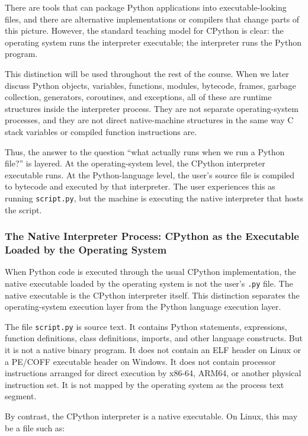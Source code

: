 \documentclass[a4paper,twoside]{report}
\begin{document}
There are tools that can package Python applications into executable-looking files, and there are alternative implementations or compilers that change parts of this picture. However, the standard teaching model for CPython is clear: the operating system runs the interpreter executable; the interpreter runs the Python program.

This distinction will be used throughout the rest of the course. When we later discuss Python objects, variables, functions, modules, bytecode, frames, garbage collection, generators, coroutines, and exceptions, all of these are runtime structures inside the interpreter process. They are not separate operating-system processes, and they are not direct native-machine structures in the same way C stack variables or compiled function instructions are.

Thus, the answer to the question ``what actually runs when we run a Python file?'' is layered. At the operating-system level, the CPython interpreter executable runs. At the Python-language level, the user's source file is compiled to bytecode and executed by that interpreter. The user experiences this as running \texttt{script.py}, but the machine is executing the native interpreter that hosts the script.


\subsubsection{The Native Interpreter Process: CPython as the Executable Loaded by the Operating System}

When Python code is executed through the usual CPython implementation, the native executable loaded by the operating system is not the user's \texttt{.py} file. The native executable is the CPython interpreter itself. This distinction separates the operating-system execution layer from the Python language execution layer.

The file \texttt{script.py} is source text. It contains Python statements, expressions, function definitions, class definitions, imports, and other language constructs. But it is not a native binary program. It does not contain an ELF header on Linux or a PE/COFF executable header on Windows. It does not contain processor instructions arranged for direct execution by x86-64, ARM64, or another physical instruction set. It is not mapped by the operating system as the process text segment.

By contrast, the CPython interpreter is a native executable. On Linux, this may be a file such as:
\end{document}
